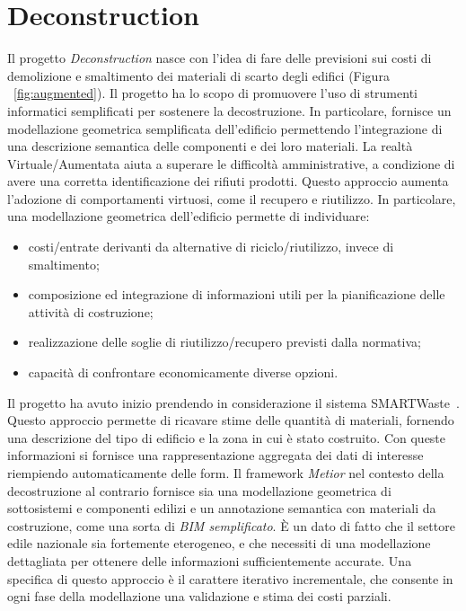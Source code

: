 \section{Deconstruction}
\label{sec:chapter_4_section_3}

Il progetto \emph{Deconstruction} nasce con l'idea di fare delle previsioni
sui costi di demolizione e smaltimento dei materiali di scarto degli edifici (Figura ~\ref{fig:augmented}).
Il progetto ha lo scopo di promuovere l'uso di strumenti informatici semplificati per sostenere la decostruzione.
In particolare, fornisce un modellazione geometrica semplificata dell'edificio permettendo l'integrazione di una descrizione
semantica delle componenti e dei loro materiali.
La realtà Virtuale/Aumentata aiuta a superare le difficoltà amministrative, a condizione di avere una
corretta identificazione dei rifiuti prodotti. Questo approccio aumenta l'adozione di comportamenti virtuosi,
come il recupero e riutilizzo.
In particolare, una modellazione geometrica dell'edificio permette di individuare:
\begin{itemize}
  \item  costi/entrate derivanti da alternative di riciclo/riutilizzo, invece di smaltimento;
  \item  composizione ed integrazione di informazioni utili per la pianificazione delle attività di costruzione;
  \item  realizzazione delle soglie di riutilizzo/recupero previsti dalla normativa;
  \item  capacità di confrontare economicamente diverse opzioni.
\end{itemize}

Il progetto ha avuto inizio prendendo in considerazione il sistema SMARTWaste~\cite{smartWaste}.
Questo approccio permette di ricavare stime delle quantità di materiali, fornendo una descrizione del tipo di edificio
e la zona in cui è stato costruito. Con queste informazioni si fornisce una rappresentazione aggregata dei dati di
interesse riempiendo automaticamente delle form.
Il framework \emph{Metior} nel contesto della decostruzione al contrario fornisce sia una modellazione geometrica di sottosistemi
e componenti edilizi e un annotazione semantica con materiali da costruzione, come una sorta di \emph{BIM semplificato}.
È un dato di fatto che il settore edile nazionale sia fortemente eterogeneo, e che necessiti di una modellazione
dettagliata per ottenere delle informazioni sufficientemente accurate.
Una specifica di questo approccio è il carattere iterativo incrementale,
che consente in ogni fase della modellazione una validazione e stima dei costi parziali.

